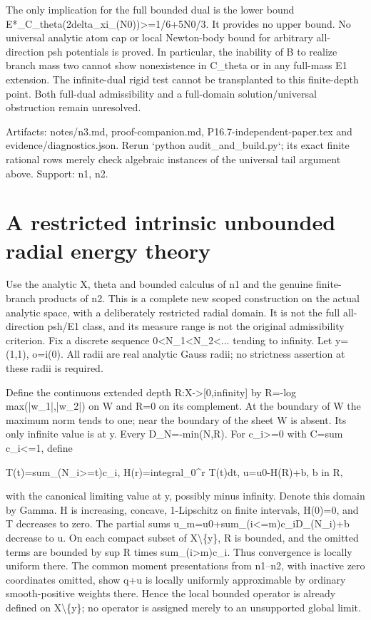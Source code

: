 \documentclass[11pt]{article}
\begin{document}
The only implication for the full bounded dual is the lower bound E*\_C\_theta(2delta\_xi\_(N0))>=1/6+5N0/3. It provides no upper bound. No universal analytic atom cap or local Newton-body bound for arbitrary all-direction psh potentials is proved. In particular, the inability of B to realize branch mass two cannot show nonexistence in C\_theta or in any full-mass E1 extension. The infinite-dual rigid test cannot be transplanted to this finite-depth point. Both full-dual admissibility and a full-domain solution/universal obstruction remain unresolved.

Artifacts: notes/n3.md, proof-companion.md, P16.7-independent-paper.tex and evidence/diagnostics.json. Rerun `python audit\_and\_build.py`; its exact finite rational rows merely check algebraic instances of the universal tail argument above. Support: n1, n2.

\section*{A restricted intrinsic unbounded radial energy theory}

Use the analytic X, theta and bounded calculus of n1 and the genuine finite-branch products of n2. This is a complete new scoped construction on the actual analytic space, with a deliberately restricted radial domain. It is not the full all-direction psh/E1 class, and its measure range is not the original admissibility criterion. Fix a discrete sequence 0<N\_1<N\_2<... tending to infinity. Let y=(1,1), o=i(0). All radii are real analytic Gauss radii; no strictness assertion at these radii is required.

Define the continuous extended depth R:X->[0,infinity] by R=-log max(|w\_1|,|w\_2|) on W and R=0 on its complement. At the boundary of W the maximum norm tends to one; near the boundary of the sheet W is absent. Its only infinite value is at y. Every D\_N=-min(N,R). For c\_i>=0 with C=sum c\_i<=1, define

T(t)=sum\_(N\_i>=t)c\_i, H(r)=integral\_0\textasciicircum{}r T(t)dt,
u=u0-H(R)+b, b in R,

with the canonical limiting value at y, possibly minus infinity. Denote this domain by Gamma. H is increasing, concave, 1-Lipschitz on finite intervals, H(0)=0, and T decreases to zero. The partial sums u\_m=u0+sum\_(i<=m)c\_iD\_(N\_i)+b decrease to u. On each compact subset of X\textbackslash{}\{y\}, R is bounded, and the omitted terms are bounded by sup R times sum\_(i>m)c\_i. Thus convergence is locally uniform there. The common moment presentations from n1--n2, with inactive zero coordinates omitted, show q+u is locally uniformly approximable by ordinary smooth-positive weights there. Hence the local bounded operator is already defined on X\textbackslash{}\{y\}; no operator is assigned merely to an unsupported global limit.
\end{document}
